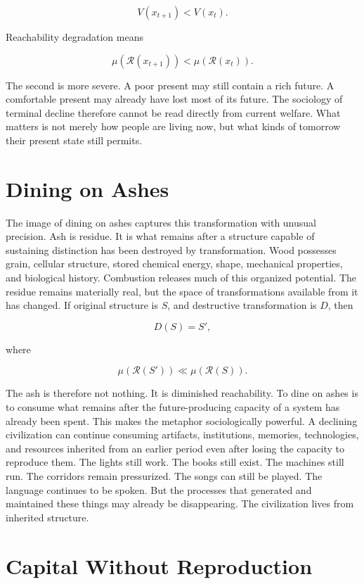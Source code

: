\documentclass[11pt,oneside]{book}
\theoremstyle{definition}
\theoremstyle{remark}
\newcommand{\R}{\mathcal{R}}
\begin{document}
\[
V(x_{t+1})<V(x_t).
\]

Reachability degradation means

\[
\mu(\R(x_{t+1})) < \mu(\R(x_t)).
\]

The second is more severe. A poor present may still contain a rich future. A comfortable present may
already have lost most of its future. The sociology of terminal decline therefore cannot be read
directly from current welfare. What matters is not merely how people are living now, but what kinds
of tomorrow their present state still permits.

\section{Dining on Ashes}

The image of dining on ashes captures this transformation with unusual precision. Ash is residue. It
is what remains after a structure capable of sustaining distinction has been destroyed by
transformation. Wood possesses grain, cellular structure, stored chemical energy, shape, mechanical
properties, and biological history. Combustion releases much of this organized potential. The
residue remains materially real, but the space of transformations available from it has changed. If
original structure is \(S\), and destructive transformation is \(D\), then

\[
D(S)=S',
\]

where

\[
\mu(\R(S')) \ll \mu(\R(S)).
\]

The ash is therefore not nothing. It is diminished reachability. To dine on ashes is to consume what
remains after the future-producing capacity of a system has already been spent. This makes the
metaphor sociologically powerful. A declining civilization can continue consuming artifacts,
institutions, memories, technologies, and resources inherited from an earlier period even after
losing the capacity to reproduce them. The lights still work. The books still exist. The machines
still run. The corridors remain pressurized. The songs can still be played. The language continues
to be spoken. But the processes that generated and maintained these things may already be
disappearing. The civilization lives from inherited structure.

\section{Capital Without Reproduction}
\end{document}
